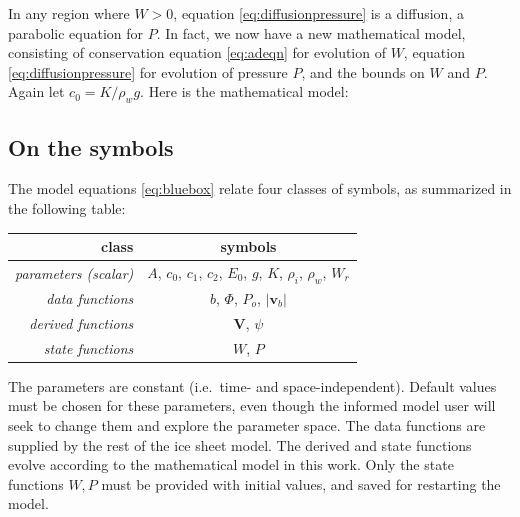 \documentclass[11pt,final]{amsart}%
\newcommand*\mybluebox[1]{%
\colorbox{myblue}{\hspace{1em}#1\hspace{1em}}}
\newcommand\bv{\mathbf{v}}
\newcommand\bV{\mathbf{V}}
\newcommand{\Div}{\nabla\cdot}
\newcommand{\grad}{\nabla}
\begin{document}
In any region where $W>0$, equation \eqref{eq:diffusionpressure} is a diffusion, a parabolic equation for $P$.  In fact, we now have a new mathematical model, consisting of conservation equation \eqref{eq:adeqn} for evolution of $W$, equation \eqref{eq:diffusionpressure} for evolution of pressure $P$, and the bounds on $W$ and $P$.  Again let $c_0 = K / \rho_w g$.  Here is the mathematical model:


\subsection*{On the symbols}  The model equations \eqref{eq:bluebox} relate four classes of symbols, as summarized in the following table:

\begin{table}[h]
\begin{tabular}{r|c}
class & symbols \\ \hline
\emph{parameters (scalar)} & $A$, $c_0$, $c_1$, $c_2$, $E_0$, $g$, $K$, $\rho_i$, $\rho_w$, $W_r$ \\
\emph{data functions} & $b$, $\Phi$, $P_o$, $|\bv_b|$ \\
\emph{derived functions} & $\bV$, $\psi$ \\
\emph{state functions} & $W$, $P$
\end{tabular}
\end{table}

The parameters are constant (i.e.~time- and space-independent).  Default values must be chosen for these parameters, even though the informed model user will seek to change them and explore the parameter space.  The data functions are supplied by the rest of the ice sheet model.  The derived and state functions evolve according to the mathematical model in this work.  Only the state functions $W,P$ must be provided with initial values, and saved for restarting the model.
\end{document}
